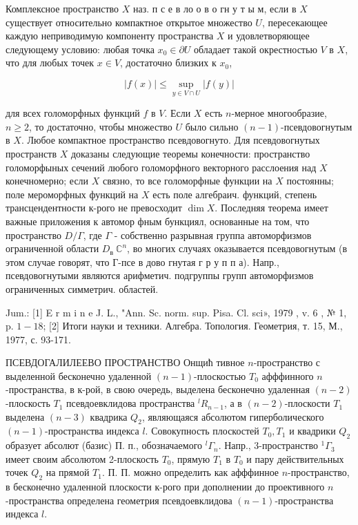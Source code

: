 \documentclass[10pt]{article}
\begin{document}
Комплексное пространство $X$ наз. п с е в ло о в о гн у т ы м, если в $X$ существует относительно компактное открытое множество $U$, пересекающее каждую неприводимую компоненту пространства $X$ и удовлетворяющее следующему условию: любая точка $x_{0} \in \partial U$ обладает такой окрестностью $V$ в $X$, что для любых точек $x \in V$, достаточно близких к $x_{0}$,



\[

|f(x)| \leqslant \sup _{y \in V \cap U}|f(y)|

\]



для всех голоморфных функций $f$ в $V$. Если $X$ есть $n$-мерное многообразие, $n \geqslant 2$, то достаточно, чтобы множество $U$ было сильно $(n-1)$-псевдовогнутым в $X$. Любое компактное пространство псевдовогнуто. Для псевдовогнутых пространств $X$ доказаны следующие теоремы конечности: пространство голоморфыных сечений любого голоморфного векторного расслоения над $X$ конечномерно; если $X$ связно, то все голоморфные функции на $X$ постоянны; поле мероморфных функций на $X$ есть поле алгебраич. функций, степень трансцендентности к-рого не превосходит $\operatorname{dim} X$. Последняя теорема имеет важные приложения к автомор фным бункциял, основанные на том, что пространство $D / \Gamma$, где $\Gamma$ - собственно разрывная группа автоморфизмов ограниченной области $D_{\text {в }} \mathbb{C}^{n}$, во многих случаях оказывается псевдовогнутым (в этом случае говорят, что Г-псе в дово гнутая г р у п п а). Напр., псевдовогнутыми являются арифметич. подгруппы групп автоморфизмов ограниченных симметрич. областей.



Jum.: [1] E r m i n e J. L., "Ann. Sc. norm. sup. Pisa. Cl. sci», 1979 , v. 6 , № 1, p. $1-18$; [2] Итоги науки и техники. Алгебра. Топология. Геометрия, т. 15, М., 1977, с. 93-171.



ПСЕВДОГАЛИЛЕЕВО ПРОСТРАНСТВО Онщић тивное $n$-пространство с выделенной бесконечно удаленной $(n-1)$-плоскостью $T_{0}$ афффинного $n$-пространства, в к-рой, в свою очередь, выделена бесконечно удаленная $(n-2)$-плоскость $T_{1}$ псевдоевклидова пространства ${ }^{l} R_{n-1}$, а в $(n-2)$-плоскости $T_{1}$ выделена $(n-3)$ квадрика $Q_{2}$, являющаяся абсолютом гиперболического $(n-1)$-пространства индекса $l$. Совокупность плоскостей $T_{0}, T_{1}$ и квадрики $Q_{2}$ образует абсолют (базис) П. п., обозначаемого ${ }^{l} \Gamma_{n}$. Напр., 3-пространство ${ }^{1} \Gamma_{3}$ имеет своим абсолютом 2-плоскость $T_{0}$, прямую $T_{1}$ в $T_{0}$ и пару действительных точек $Q_{2}$ на прямой $T_{1}$. П. П. можно определить как афффинное $n$-пространство, в бесконечно удаленной плоскости к-рого при дополнении до проективного $n$-пространства определена геометрия псевдоевклидова $(n-1)$-пространства индекса $l$.
\end{document}
